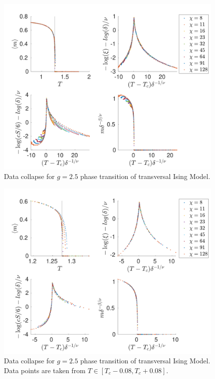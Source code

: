 \begin{figure}[h!]
    \center
    \includegraphics[width=\textwidth]{Figuren/phasediag/g25/Full.pdf}
    \caption{ Data collapse for $g=2.5$ phase transition of transversal Ising Model. }
    \label{fig:phase:g25:full}
\end{figure}

\begin{figure}[h!]
    \center
    \includegraphics[width=\textwidth]{Figuren/phasediag/g25/zoomed.pdf}
    \caption{ Data collapse for $g=2.5$ phase transition of transversal Ising Model. Data points are taken from $T \in \left[ T_c -0.08, T_c +0.08 \right]$. }
    \label{fig:phase:g25:zoomed}
\end{figure}

